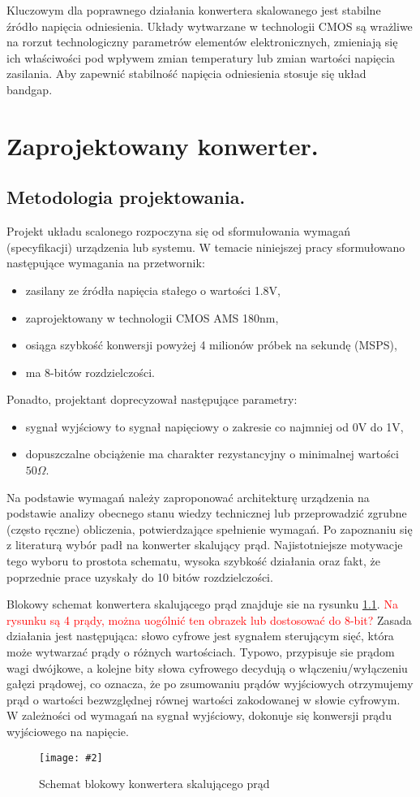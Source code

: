 \documentclass[10pt,a4paper]{report}
\newcommand{\img}[4]{
	\begin{figure}[H]
		\begin{center}
			\texttt{[image: \#2]}
			\caption{#3}
			\label{#4}
		\end{center}
	\end{figure}
}
\begin{document}
	{	Kluczowym dla poprawnego działania konwertera skalowanego jest stabilne źródło napięcia odniesienia. Układy wytwarzane w technologii CMOS są wrażliwe na rorzut technologiczny parametrów elementów elektronicznych, zmieniają się ich właściwości pod wpływem zmian temperatury lub zmian wartości napięcia zasilania. Aby zapewnić stabilność napięcia odniesienia stosuje się układ bandgap. }

	\chapter{Zaprojektowany konwerter.}
	\section{Metodologia projektowania.}
	{	Projekt układu scalonego rozpoczyna się od sformułowania wymagań (specyfikacji) urządzenia lub systemu. W temacie niniejszej pracy 	sformułowano następujące wymagania na przetwornik:
		\begin{itemize}
			\item zasilany ze źródła napięcia stałego o wartości 1.8V,
			\item zaprojektowany w technologii CMOS AMS 180nm,
			\item osiąga szybkość konwersji powyżej 4 milionów próbek na sekundę (MSPS),
			\item ma 8-bitów rozdzielczości.
		\end{itemize} 
		Ponadto, projektant doprecyzował następujące parametry:
		\begin{itemize}
			\item sygnał wyjściowy to sygnał napięciowy o zakresie co najmniej od 0V do 1V,
			\item dopuszczalne obciążenie ma charakter rezystancyjny o minimalnej wartości $50\Omega$.
		\end{itemize} }
	
	{	Na podstawie wymagań należy zaproponować architekturę urządzenia na podstawie analizy obecnego stanu wiedzy technicznej lub przeprowadzić zgrubne (często ręczne) obliczenia, potwierdzające spełnienie wymagań. Po zapoznaniu się z literaturą wybór padł na konwerter skalujący prąd. Najistotniejsze motywacje tego wyboru to prostota schematu, wysoka szybkość działania oraz fakt, że poprzednie prace uzyskały do 10 bitów rozdzielczości.	}
	
	{	Blokowy schemat konwertera skalującego prąd znajduje sie na rysunku \ref{currentscale}. \textcolor{red}{Na rysunku są 4 prądy, można uogólnić ten obrazek lub dostosować do 8-bit?} Zasada działania jest następująca: słowo cyfrowe jest sygnałem sterującym sięć, która może wytwarzać prądy o różnych wartościach. Typowo, przypisuje sie prądom wagi dwójkowe, a kolejne bity słowa cyfrowego decydują o włączeniu/wyłączeniu gałęzi prądowej, co oznacza, że po zsumowaniu prądów wyjściowych otrzymujemy prąd o wartości  bezwzględnej równej wartości zakodowanej w słowie cyfrowym. W zależności od wymagań na sygnał wyjściowy, dokonuje się konwersji prądu wyjściowego na napięcie. 
		\img{20}{../visio/currentscale.pdf}{Schemat blokowy konwertera skalującego prąd}{currentscale}	}
\end{document}

